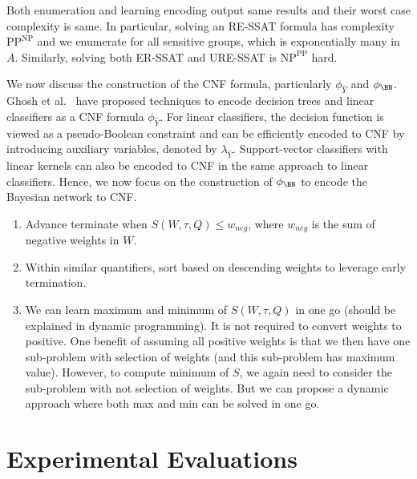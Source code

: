 Both enumeration and learning encoding output same results and their worst case complexity is same. In particular, solving an  RE-SSAT formula has complexity $ \text{PP}^{\text{NP}} $ and we enumerate for all sensitive groups, which is exponentially many in $ A $. Similarly, solving both ER-SSAT and URE-SSAT is $ \text{NP}^{\text{PP}} $ hard.

We now discuss the construction of the CNF formula, particularly $ \phi_{\hat{Y}} $ and $ \phi_\BN $. Ghosh et al.~\cite{ghosh2020justicia} have proposed techniques to encode decision trees and linear classifiers as a CNF formula $ \phi_{\hat{Y}} $. For linear classifiers, the decision function is viewed as a pseudo-Boolean constraint and can be efficiently encoded to CNF by introducing auxiliary variables, denoted by $ \lambda_{\hat{Y}} $.  Support-vector classifiers with linear kernels can also be encoded to CNF in the same approach to linear classifiers. Hence, we now focus on the construction of $ \phi_\BN $ to encode the Bayesian network to CNF.








\begin{enumerate}
	\item Advance terminate when $ S(W,\tau, Q) \le w_{neg} $, where $ w_{neg} $ is the sum of negative weights in $ W $.
	\item Within similar quantifiers, sort based on descending weights to leverage early termination.
	\item We can learn maximum and minimum of $ S(W,\tau,Q) $ in one go (should be explained in dynamic programming). It is not required to convert weights to positive. One benefit of assuming all positive weights is that we then have one sub-problem with selection of weights (and this sub-problem has maximum value). However, to compute minimum of $ S $, we again need to consider the sub-problem with not selection of weights. But we can propose a dynamic approach where both max and min can be solved in one go. 
\end{enumerate}






\section{Experimental Evaluations}






